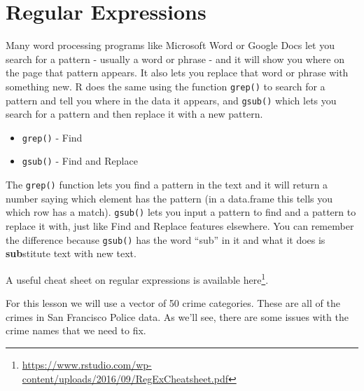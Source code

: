 \documentclass[
]{krantz}
\providecommand{\tightlist}{%
  \setlength{\itemsep}{0pt}\setlength{\parskip}{0pt}}
\renewcommand{\href}[2]{#2\footnote{\url{#1}}}
\begin{document}
\hypertarget{regular-expressions}{%
\chapter{Regular Expressions}\label{regular-expressions}}

Many word processing programs like Microsoft Word or Google
Docs let you search for a pattern - usually a word or phrase
- and it will show you where on the page that pattern
appears. It also lets you replace that word or phrase with
something new. R does the same using the function
\texttt{grep()} to search for a pattern and tell you where
in the data it appears, and \texttt{gsub()} which lets you
search for a pattern and then replace it with a new pattern.

\begin{itemize}
\tightlist
\item
  \texttt{grep()} - Find
\item
  \texttt{gsub()} - Find and Replace
\end{itemize}

The \texttt{grep()} function lets you find a pattern in the
text and it will return a number saying which element has
the pattern (in a data.frame this tells you which row has a
match). \texttt{gsub()} lets you input a pattern to find and
a pattern to replace it with, just like Find and Replace
features elsewhere. You can remember the difference because
\texttt{gsub()} has the word ``sub'' in it and what it does
is \textbf{sub}stitute text with new text.

A useful cheat sheet on regular expressions is available
\href{https://www.rstudio.com/wp-content/uploads/2016/09/RegExCheatsheet.pdf}{here}.

For this lesson we will use a vector of 50 crime categories.
These are all of the crimes in San Francisco Police data. As
we'll see, there are some issues with the crime names that
we need to fix.
\end{document}
